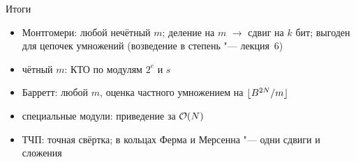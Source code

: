 \documentclass{ca-slides}
\begin{document}
\begin{canvasframe}{Итоги}
  \small
  \begin{itemize}
    \item Монтгомери: любой нечётный $m$; деление на $m$ $\to$ сдвиг на $k$ бит;
      выгоден для цепочек умножений (возведение в степень "--- лекция~6)
    \item чётный $m$: КТО по модулям $2^e$ и $s$
    \item Барретт: любой $m$, оценка частного умножением на $\lfloor B^{2N}/m\rfloor$
    \item специальные модули: приведение за $\mathcal{O}(N)$
    \item ТЧП: точная свёртка; в кольцах Ферма и Мерсенна "--- одни сдвиги и сложения
  \end{itemize}
\end{canvasframe}
\end{document}
